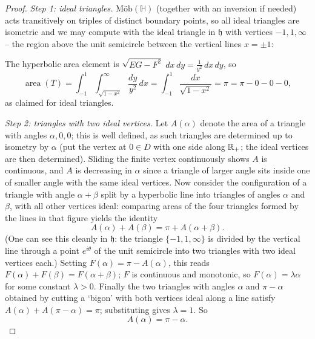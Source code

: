 \documentclass[a4paper]{scrartcl}
\newcommand{\Mob}{\text{M\"ob}}
\newcommand{\HH}{\mathbb{H}}
\begin{document}
\begin{proof}
    \emph{Step 1: ideal triangles.} $\Mob(\HH)$ (together with an inversion if needed) acts transitively on triples of distinct boundary points, so all ideal triangles are isometric and we may compute with the ideal triangle in $\mathfrak{h}$ with vertices $-1, 1, \infty$ -- the region above the unit semicircle between the vertical lines $x = \pm 1$:
    \begin{center}
    \end{center}
    The hyperbolic area element is $\sqrt{EG - F^2}\; dx\, dy = \frac{1}{y^2}\, dx \, dy$, so
    $$
    \operatorname{area}(T) = \int_{-1}^1 \int_{\sqrt{1 - x^2}}^{\infty} \frac{dy}{y^2}\, dx = \int_{-1}^1 \frac{dx}{\sqrt{1 - x^2}} = \pi = \pi - 0 - 0 - 0,
    $$
    as claimed for ideal triangles.

    \emph{Step 2: triangles with two ideal vertices.} Let $A(\alpha)$ denote the area of a triangle with angles $\alpha, 0, 0$; this is well defined, as such triangles are determined up to isometry by $\alpha$ (put the vertex at $0 \in D$ with one side along $\mathbb{R}_+$; the ideal vertices are then determined). Sliding the finite vertex continuously shows $A$ is continuous, and $A$ is decreasing in $\alpha$ since a triangle of larger angle sits inside one of smaller angle with the same ideal vertices. Now consider the configuration of a triangle with angle $\alpha + \beta$ split by a hyperbolic line into triangles of angles $\alpha$ and $\beta$, with all other vertices ideal: comparing areas of the four triangles formed by the lines in that figure yields the identity
    $$
    A(\alpha) + A(\beta) = \pi + A(\alpha + \beta).
    $$
    (One can see this cleanly in $\mathfrak{h}$: the triangle $\{-1, 1, \infty\}$ is divided by the vertical line through a point $e^{i\theta}$ of the unit semicircle into two triangles with two ideal vertices each.) Setting $F(\alpha) = \pi - A(\alpha)$, this reads $F(\alpha) + F(\beta) = F(\alpha + \beta)$; $F$ is continuous and monotonic, so $F(\alpha) = \lambda \alpha$ for some constant $\lambda > 0$. Finally the two triangles with angles $\alpha$ and $\pi - \alpha$ obtained by cutting a `bigon' with both vertices ideal along a line satisfy $A(\alpha) + A(\pi - \alpha) = \pi$; substituting gives $\lambda = 1$. So
    $$
    A(\alpha) = \pi - \alpha.
    $$


\end{proof}
\end{document}
